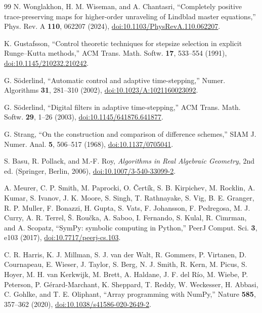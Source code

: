 \begin{thebibliography}{99}
N. Wonglakhon, H. M. Wiseman, and A. Chantasri, ``Completely positive trace-preserving maps for higher-order unraveling of Lindblad master equations,'' Phys. Rev. A \textbf{110}, 062207 (2024), \href{https://doi.org/10.1103/PhysRevA.110.062207}{doi:10.1103/PhysRevA.110.062207}.

K. Gustafsson, ``Control theoretic techniques for stepsize selection in explicit Runge--Kutta methods,'' ACM Trans. Math. Softw. \textbf{17}, 533--554 (1991), \href{https://doi.org/10.1145/210232.210242}{doi:10.1145/210232.210242}.

G. S\"oderlind, ``Automatic control and adaptive time-stepping,'' Numer. Algorithms \textbf{31}, 281--310 (2002), \href{https://doi.org/10.1023/A:1021160023092}{doi:10.1023/A:1021160023092}.

G. S\"oderlind, ``Digital filters in adaptive time-stepping,'' ACM Trans. Math. Softw. \textbf{29}, 1--26 (2003), \href{https://doi.org/10.1145/641876.641877}{doi:10.1145/641876.641877}.

G. Strang, ``On the construction and comparison of difference schemes,'' SIAM J. Numer. Anal. \textbf{5}, 506--517 (1968), \href{https://doi.org/10.1137/0705041}{doi:10.1137/0705041}.

S. Basu, R. Pollack, and M.-F. Roy, \textit{Algorithms in Real Algebraic Geometry}, 2nd ed. (Springer, Berlin, 2006), \href{https://doi.org/10.1007/3-540-33099-2}{doi:10.1007/3-540-33099-2}.

A. Meurer, C. P. Smith, M. Paprocki, O. \v{C}ert\'ik, S. B. Kirpichev, M. Rocklin, A. Kumar, S. Ivanov, J. K. Moore, S. Singh, T. Rathnayake, S. Vig, B. E. Granger, R. P. Muller, F. Bonazzi, H. Gupta, S. Vats, F. Johansson, F. Pedregosa, M. J. Curry, A. R. Terrel, \v{S}. Rou\v{c}ka, A. Saboo, I. Fernando, S. Kulal, R. Cimrman, and A. Scopatz, ``SymPy: symbolic computing in Python,'' PeerJ Comput. Sci. \textbf{3}, e103 (2017), \href{https://doi.org/10.7717/peerj-cs.103}{doi:10.7717/peerj-cs.103}.

C. R. Harris, K. J. Millman, S. J. van der Walt, R. Gommers, P. Virtanen, D. Cournapeau, E. Wieser, J. Taylor, S. Berg, N. J. Smith, R. Kern, M. Picus, S. Hoyer, M. H. van Kerkwijk, M. Brett, A. Haldane, J. F. del R\'io, M. Wiebe, P. Peterson, P. G\'erard-Marchant, K. Sheppard, T. Reddy, W. Weckesser, H. Abbasi, C. Gohlke, and T. E. Oliphant, ``Array programming with NumPy,'' Nature \textbf{585}, 357--362 (2020), \href{https://doi.org/10.1038/s41586-020-2649-2}{doi:10.1038/s41586-020-2649-2}.


\end{thebibliography}
